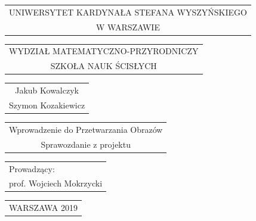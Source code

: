 \documentclass[magisterska,openany]{pracadypl}
\begin{document}
\begin{titlepage}
\vspace{-0.5cm}

{\centering
{\footnotesize
\begin{tabular}{c}
UNIWERSYTET KARDYNAŁA STEFANA WYSZYŃSKIEGO\\
W WARSZAWIE\\
\end{tabular}
}
\vspace{2.5cm}

{\footnotesize
\begin{tabular}{c}
WYDZIAŁ MATEMATYCZNO-PRZYRODNICZY\\
SZKOŁA NAUK ŚCISŁYCH\\
\end{tabular}
}
\vspace{3.5cm}

\renewcommand{\arraystretch}{1.5} %

{\normalsize
\begin{tabular}{c}
Jakub Kowalczyk\\
Szymon Kozakiewicz\\
\end{tabular}
}

\vspace{2cm}

{\LARGE
\begin{tabular}{c}
Wprowadzenie do Przetwarzania Obrazów\\
Sprawozdanie z projektu\\
\end{tabular}
}

}

\renewcommand{\arraystretch}{1} %

\vspace{5cm}

\hspace{6cm}
\begin{tabular}{l}
Prowadzący:\\
prof. Wojciech Mokrzycki
\end{tabular}

\vspace{3cm}

{\centering

{\small
\begin{tabular}{c}
{WARSZAWA 2019}\\
\end{tabular}
}
\tableofcontents

}
\end{titlepage}
\end{document}
